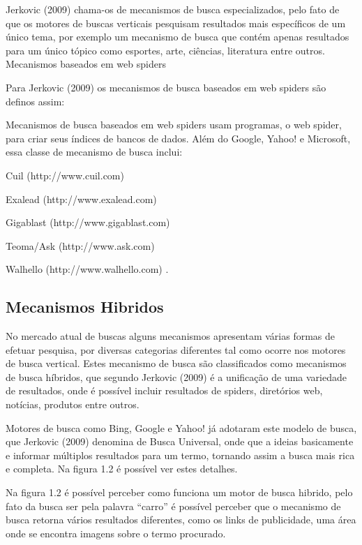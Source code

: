 \documentclass[
	12pt,				%
	openright,			%
	twoside,			%
	a4paper,			%
	english,			%
	french,				%
	spanish,			%
	brazil				%
	]{abntex2}
\begin{document}
Jerkovic (2009) chama-os de mecanismos de busca especializados, pelo fato de que os motores de buscas verticais pesquisam resultados mais específicos de um único tema, por exemplo um mecanismo de busca que contém apenas resultados para um único tópico como esportes, arte, ciências, literatura entre outros.
Mecanismos baseados em web spiders

Para Jerkovic (2009) os mecanismos de busca baseados em web spiders são definos assim:


\begin{citacao}
Mecanismos de busca baseados em web spiders usam programas, o web spider, para criar seus índices de bancos de dados. Além do Google, Yahoo! e Microsoft, essa classe de mecanismo de busca inclui:

\item Cuil (http://www.cuil.com)
\item Exalead (http://www.exalead.com)
\item Gigablast (http://www.gigablast.com)
\item Teoma/Ask (http://www.ask.com)
\item Walhello (http://www.walhello.com)
\cite[5.3]{NBR10520:2002}.
\end{citacao}

\subsection{Mecanismos Hibridos}

No mercado atual de buscas alguns mecanismos apresentam várias formas de efetuar pesquisa, por diversas categorias diferentes tal como ocorre nos motores de busca vertical. Estes mecanismo de busca são classificados como mecanismos de busca híbridos, que segundo Jerkovic (2009) é a unificação de uma variedade de resultados, onde é possível incluir resultados de spiders, diretórios web, notícias, produtos entre outros.

Motores de busca como Bing, Google e Yahoo! já adotaram este modelo de busca, que Jerkovic (2009) denomina de Busca Universal, onde que a ideias basicamente e informar múltiplos resultados para um termo, tornando assim a busca mais rica e completa. Na figura 1.2 é possível ver estes detalhes.

Na figura 1.2 é possível perceber como funciona um motor de busca hibrido, pelo fato da busca ser pela palavra “carro” é possível perceber que o mecanismo de busca retorna vários resultados diferentes, como os links de publicidade, uma área onde se encontra imagens sobre o termo procurado.
\end{document}
